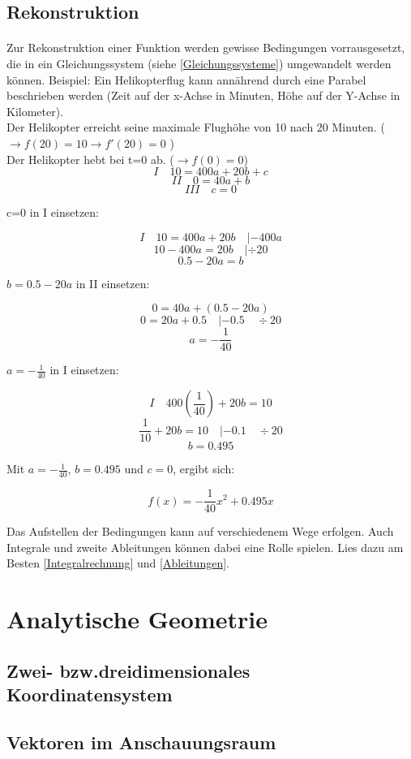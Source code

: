 \documentclass{article}
\begin{document}
\subsection{Rekonstruktion}\label{Rekonstruktion}
\paragraph{}
Zur Rekonstruktion einer Funktion werden gewisse Bedingungen vorrausgesetzt, die in ein Gleichungssystem (siehe \ref{Gleichungssysteme}) umgewandelt werden können.
Beispiel: Ein Helikopterflug kann annährend durch eine Parabel beschrieben werden (Zeit auf der x-Achse in Minuten, Höhe auf der Y-Achse in Kilometer). \\
Der Helikopter erreicht seine maximale Flughöhe von 10 nach 20 Minuten. ( $ \rightarrow f(20)=10 \rightarrow f'(20)=0 $ ) \\
Der Helikopter hebt bei t=0 ab. ($ \rightarrow f(0)=0$) \\

\[ I \quad 10=400a+20b+c \]
\[ II \quad 0=40a+b \]
\[ III \quad c=0 \]

c=0 in I einsetzen:

\[I \quad 10=400a+20b \quad |-400a \]
\[ 10-400a=20b \quad | \div 20\]
\[ 0.5-20a=b\]

$b= 0.5-20a $ in II einsetzen:

\[ 0=40a+(0.5-20a)\]
\[ 0=20a+0.5 \quad |-0.5 \quad \div 20\]
\[ a=-\frac{1}{40} \]

$a=-\frac{1}{40}$ in I einsetzen:

\[ I \quad 400(\frac{1}{40})+20b=10 \]
\[ \frac{1}{10}+20b=10 \quad |-0.1 \quad \div 20\]
\[ b=0.495\]

Mit $a=-\frac{1}{40}$, $b=0.495$ und $c=0$, ergibt sich:

\[f(x)=-\frac{1}{40}x^2+0.495x\]

Das Aufstellen der Bedingungen kann auf verschiedenem Wege erfolgen. Auch Integrale und zweite Ableitungen können dabei eine Rolle spielen.
Lies dazu am Besten \ref{Integralrechnung} und \ref{Ableitungen}.

\section{Analytische Geometrie}
\subsection{Zwei- bzw.dreidimensionales Koordinatensystem}
\subsection{Vektoren im Anschauungsraum}
\end{document}
